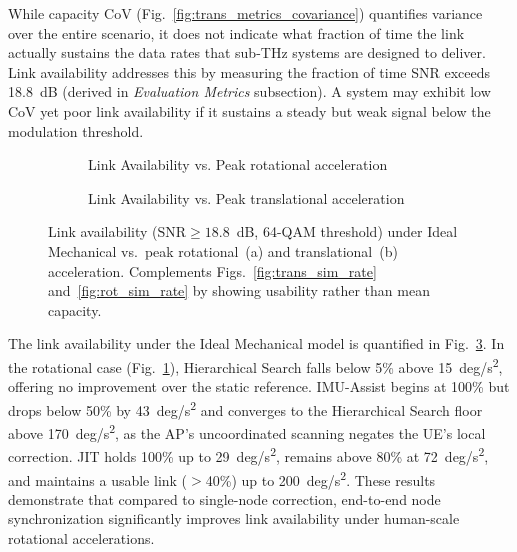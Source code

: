 \documentclass[fleqn,10pt]{wlscirep}
\begin{document}
While capacity CoV (Fig.~\ref{fig:trans_metrics_covariance}) quantifies variance over the entire scenario, it does not indicate what fraction of time the link actually sustains the data rates that sub-THz systems are designed to deliver\cite{Dang2020, Nokia2022}. Link availability addresses this by measuring the fraction of time SNR exceeds \SI{18.8}{dB} (derived in \textit{Evaluation Metrics} subsection). A system may exhibit low CoV yet poor link availability if it sustains a steady but weak signal below the modulation threshold.

\begin{figure}[h!]
    \centering
    \begin{subfigure}{0.495\linewidth}
        
        \vspace{-25pt}
        \caption{Link Availability vs. Peak rotational acceleration}
        \label{fig:rotionalLinkAvail}
    \end{subfigure}
    \hfill
    \begin{subfigure}{0.495\linewidth}
        
        \vspace{-25pt}
        \caption{Link Availability vs. Peak translational acceleration}
        \label{fig:translationalLinkAvail}
    \end{subfigure}
    \caption{Link availability ($\mathrm{SNR} \geq 18.8$~dB, 64-QAM threshold) under Ideal Mechanical vs.\ peak rotational~(a) and translational~(b) acceleration. Complements Figs.~\ref{fig:trans_sim_rate} and~\ref{fig:rot_sim_rate} by showing usability rather than mean capacity.}
    \label{fig:accelLinkAvail}
    \vspace{-5pt}
\end{figure}

The link availability under the Ideal Mechanical model is quantified in Fig.~\ref{fig:accelLinkAvail}. In the rotational case (Fig.~\ref{fig:rotionalLinkAvail}), Hierarchical Search falls below 5\% above \SI{15}{deg/s^2}, offering no improvement over the static reference. IMU-Assist begins at 100\% but drops below 50\% by \SI{43}{deg/s^2} and converges to the Hierarchical Search floor above \SI{170}{deg/s^2}, as the AP's uncoordinated scanning negates the UE's local correction. JIT holds 100\% up to \SI{29}{deg/s^2}, remains above 80\% at \SI{72}{deg/s^2}, and maintains a usable link ($>$40\%) up to \SI{200}{deg/s^2}. These results demonstrate that compared to single-node correction, end-to-end node synchronization significantly improves link availability under human-scale rotational accelerations.
\end{document}
